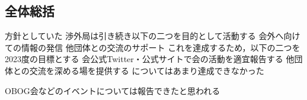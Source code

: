 \subsection*{全体総括}


方針としていた
        渉外局は引き続き以下の二つを目的として活動する
        会外へ向けての情報の発信
        他団体との交流のサポート
    これを達成するため，以下の二つを2023度の目標とする
        会公式Twitter・公式サイトで会の活動を適宜報告する
        他団体との交流を深める場を提供する
についてはあまり達成できなかった

OBOG会などのイベントについては報告できたと思われる

